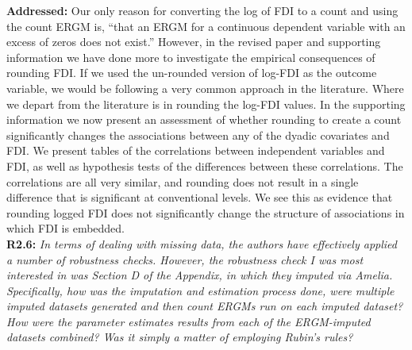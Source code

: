 \documentclass[a4paper,11pt]{texMemo}
\begin{document}
\noindent \textbf{Addressed:} Our only reason for converting the log of FDI to a count and using the count ERGM is, ``that an ERGM for a continuous dependent variable with an excess of zeros does not exist.'' However, in the revised paper and supporting information we have done more to investigate the empirical consequences of rounding FDI. If we used the un-rounded version of log-FDI as the outcome variable, we would be following a very common approach in the literature. Where we depart from the literature is in rounding the log-FDI values. In the supporting information we now present an assessment of whether rounding to create a count significantly changes the associations between any of the dyadic covariates and FDI. We present tables of the correlations between independent variables and FDI, as well as hypothesis tests of the differences between these correlations. The correlations are all very similar, and rounding does not result in a single difference that is significant at conventional levels. We see this as evidence that rounding logged FDI does not significantly change the structure of associations in which FDI is embedded. \\

\noindent \textbf{R2.6:} \emph{In terms of dealing with missing data, the authors have effectively applied a number of robustness checks. However, the robustness check I was most interested in was Section D of the Appendix, in which they imputed via Amelia. Specifically, how was the imputation and estimation process done, were multiple imputed datasets generated and then count ERGMs run on each imputed dataset? How were the parameter estimates results from each of the ERGM-imputed datasets combined? Was it simply a matter of employing Rubin's rules?}\\
\end{document}
